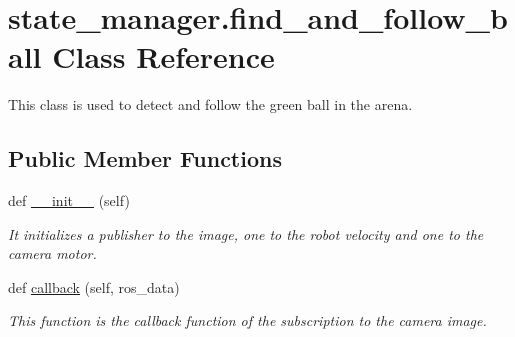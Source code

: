 \hypertarget{classstate__manager_1_1find__and__follow__ball}{}\section{state\+\_\+manager.\+find\+\_\+and\+\_\+follow\+\_\+ball Class Reference}
\label{classstate__manager_1_1find__and__follow__ball}


This class is used to detect and follow the green ball in the arena.  


\subsection*{Public Member Functions}
\begin{DoxyCompactItemize}
\item 
def \hyperlink{classstate__manager_1_1find__and__follow__ball_a6469e8486bd8e40cd87f77d93add522a}{\+\_\+\+\_\+init\+\_\+\+\_\+} (self)
\begin{DoxyCompactList}\small\item\em It initializes a publisher to the image, one to the robot velocity and one to the camera motor. \end{DoxyCompactList}\item 
def \hyperlink{classstate__manager_1_1find__and__follow__ball_ab8dc079ef8ce39c9679ed9e5428b4e8c}{callback} (self, ros\+\_\+data)
\begin{DoxyCompactList}\small\item\em This function is the callback function of the subscription to the camera image. \end{DoxyCompactList}\end{DoxyCompactItemize}

